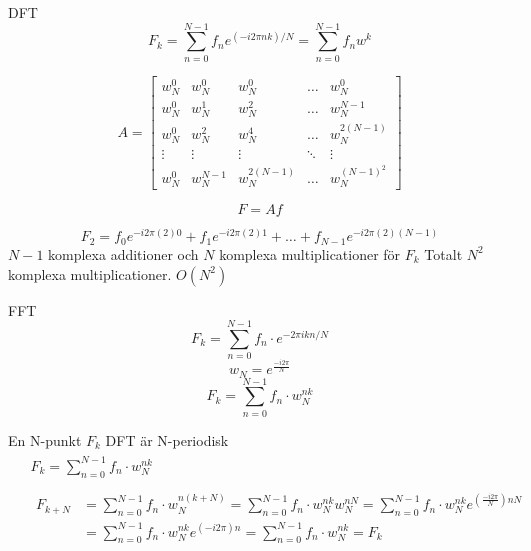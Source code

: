\documentclass[presentation]{beamer}
\begin{document}
\begin{frame}[label={sec:org183e4c4}]{DFT}
\begin{equation*}
F_{k} = \sum_{n=0}^{N-1} f_{n} e^{(-i2 \pi nk)/N} = \sum_{n=0}^{N-1} f_{n} w^{k}
\end{equation*}

\begin{equation*}
A =
\begin{bmatrix}
  w_{N}^{0} & w_{N}^{0} & w_{N}^{0} & \dots & w_{N}^{0} \\
  w_{N}^{0} & w_{N}^{1} & w_{N}^{2} & \dots & w_{N}^{N-1} \\
  w_{N}^{0} & w_{N}^{2} & w_{N}^{4} & \dots & w_{N}^{2(N-1)} \\
  \vdots & \vdots & \vdots       & \ddots & \vdots \\  
  w_{N}^{0} & w_{N}^{N-1} & w_{N}^{2(N-1)} & \dots & w_{N}^{(N-1)^{2}}
\end{bmatrix}
\end{equation*}

\begin{equation*}
F = Af
\end{equation*}

\begin{equation*}
F_{2} = f_{0}e^{-i2 \pi (2)0} + f_{1}e^{-i2 \pi (2)1} + \dots + f_{N-1}e^{-i2 \pi (2)(N-1)}
\end{equation*}
\(N - 1\) komplexa additioner och \(N\) komplexa multiplicationer för \(F_{k}\)
Totalt \(N^{2}\) komplexa multiplicationer. \(O(N^{2})\)
\end{frame}

\begin{frame}[label={sec:org477dccb}]{FFT}
\[ F_{k} = \sum_{n=0}^{N-1} f_{n} \cdot e^{-2 \pi i kn/N}\]
\pause
\[ w_{N} = e^{\frac{-i2 \pi}{N}} \]
\pause
\[ F_{k} = \sum_{n=0}^{N-1} f_{n} \cdot w_{N}^{nk} \]
\end{frame}

\begin{frame}[label={sec:orgdd589d7}]{En N-punkt \(F_{k}\) DFT är N-periodisk}
\begin{align*}
&\begin{aligned}
  F_{k} = \sum_{n=0}^{N-1}f_{n} \cdot w_{N}^{nk}
\end{aligned} \\
&\begin{aligned}
  \begin{aligned}
  F_{k+N} &= \sum_{n=0}^{N-1}f_{n} \cdot w_{N}^{n(k+N)} = \sum_{n=0}^{N-1}f_{n} \cdot w_{N}^{nk}w_{N}^{nN} = \sum_{n=0}^{N-1}f_{n} \cdot w_{N}^{nk}e^{(\frac{-i2
          \pi}{N}) nN} \\
        &= \sum_{n=0}^{N-1}f_{n} \cdot w_{N}^{nk}e^{(-i2 \pi)n} =
    \sum_{n=0}^{N-1}f_{n} \cdot w_{N}^{nk} = F_{k}
    \end{aligned}
\end{aligned}
\end{align*}
\end{frame}
\end{document}
